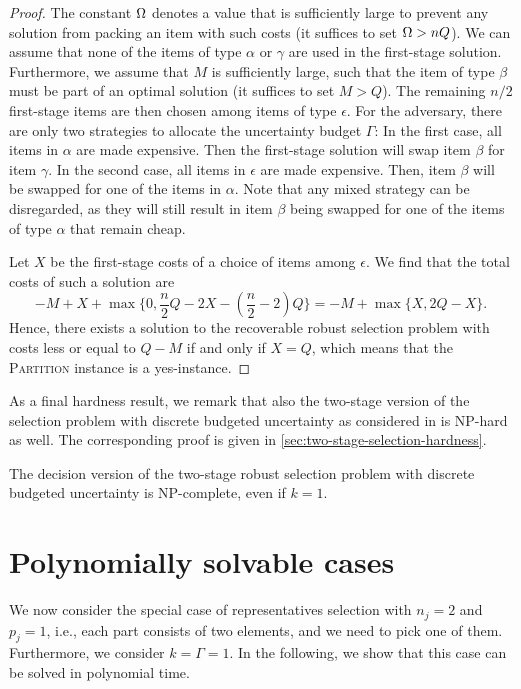 \begin{proof}
The constant $\Omega$ denotes a value that is sufficiently large to prevent any solution from packing an item with such costs (it suffices to set $\Omega > nQ$).
We can assume that none of the items of type $\alpha$ or $\gamma$ are used in the first-stage solution. Furthermore, we assume that $M$ is sufficiently large, such that the item of type $\beta$ must be part of an optimal solution (it suffices to set $M > Q$). The remaining $n/2$ first-stage items are then chosen among items of type $\epsilon$. For the adversary, there are only two strategies to allocate the uncertainty budget $\Gamma$: In the first case, all items in $\alpha$ are made expensive. Then the first-stage solution will swap item $\beta$ for item $\gamma$. In the second case, all items in $\epsilon$ are made expensive. Then, item $\beta$ will be swapped for one of the items in $\alpha$. Note that any mixed strategy can be disregarded, as they will still result in item $\beta$ being swapped for one of the items of type $\alpha$ that remain cheap.

Let $X$ be the first-stage costs of a choice of items among $\epsilon$. We find that the total costs of such a solution are
\[ -M + X + \max\{ 0, \frac{n}{2}Q-2X-(\frac{n}{2}-2)Q\} = -M + \max\{ X, 2Q-X\}. \]
Hence, there exists a solution to the recoverable robust selection problem with costs less or equal to $Q-M$ if and only if $X=Q$, which means that the \textsc{Partition} instance is a yes-instance.

\end{proof}

As a final hardness result, we remark that also the two-stage version of the selection problem with discrete budgeted uncertainty as considered in \cite{chassein2018recoverable} is NP-hard as well. The corresponding proof is given in \cref{sec:two-stage-selection-hardness}.

\begin{theorem}\label{th:hardness3}
The decision version of the two-stage robust selection problem with discrete budgeted uncertainty is NP-complete, even if $k=1$.
\end{theorem}


\section{Polynomially solvable cases}

\label{sec:special}

We now consider the special case of representatives selection with $n_j=2$ and $p_j=1$, i.e., each part consists of two elements, and we need to pick one of them. Furthermore, we consider $k=\Gamma=1$. In the following, we show that this case can be solved in polynomial time. 

